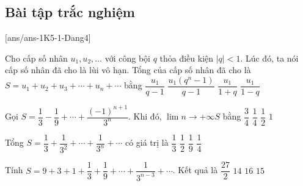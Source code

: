 \subsection*{Bài tập trắc nghiệm}
[ans/ans-1K5-1-Dang4]
\begin{ex}%
	Cho cấp số nhân $u_1,u_2,\ldots$ với công bội $q$ thỏa điều kiện $|q|<1$. Lúc đó, ta nói cấp số nhân đã cho là lùi vô hạn. Tổng của cấp số nhân đã cho là $S=u_1+u_2+u_3+\cdots +u_n+\cdots$ bằng 
	\choice
	{$\dfrac{u_1}{q-1}$}
	{$\dfrac{u_1\left(q^n-1\right)}{q-1}$}
	{$\dfrac{u_1}{1+q}$}
	{\True $\dfrac{u_1}{1-q}$}
\end{ex}
\begin{ex}%
	Gọi $S=\dfrac{1}{3}-\dfrac{1}{9}+\cdots +\dfrac{(-1)^{n+1}}{3^n}$. Khi đó, $\lim \limits{n \to +\infty}S$ bằng 
	\choice
	{$\dfrac{3}{4}$}
	{\True $\dfrac{1}{4}$}
	{$\dfrac{1}{2}$}
	{$1$}
\end{ex}
\begin{ex}%
	Tổng $S=\dfrac{1}{3}+\dfrac{1}{3^2}+\cdots +\dfrac{1}{3^n}+\cdots$ có giá trị là 
	\choice
	{$\dfrac{1}{3}$}
	{\True $\dfrac{1}{2}$}
	{$\dfrac{1}{9}$}
	{$\dfrac{1}{4}$}
\end{ex}
\begin{ex}%
	Tính $S=9+3+1+\dfrac{1}{3}+\dfrac{1}{9}+\cdots +\dfrac{1}{3^{n-3}}+\cdots$. Kết quả là 
	\choice
	{\True $\dfrac{27}{2}$}
	{$14$}
	{$16$}
	{$15$}
\end{ex}
